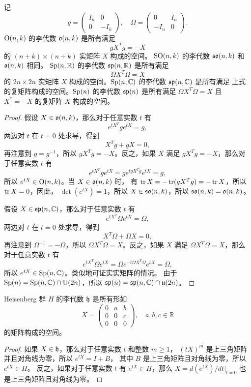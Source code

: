 \begin{proposition}
  记
  \[
    g=\begin{pmatrix}
      I_n & 0 \\
      0 & -I_k
    \end{pmatrix},\quad
    \Omega=\begin{pmatrix}
      0 & I_n \\
      -I_n & 0
    \end{pmatrix}.
  \]
  $\operatorname{O}(n,k)$ 的李代数 $\mathfrak{o}(n,k)$ 是所有满足
  \[
    gX^Tg=-X
  \]
  的 $(n+k)\times (n+k)$ 实矩阵 $X$ 构成的空间。
  $\operatorname{SO}(n,k)$ 的李代数 $\mathfrak{so}(n,k)$ 和 $\mathfrak{o}(n,k)$ 相同。
  $\operatorname{Sp}(n,\mathbb{R})$ 的李代数 $\mathfrak{sp}(n,\mathbb{R})$ 是所有满足
  \[
    \Omega X^T\Omega=X
  \]
  的 $2n\times 2n$ 实矩阵 $X$ 构成的空间。$\operatorname{Sp}(n,\mathbb{C})$ 的李代数 $\mathfrak{sp}(n,\mathbb{C})$ 是所有满足
  上式的复矩阵构成的空间。$\operatorname{Sp}(n)$ 的李代数 $\mathfrak{sp}(n)$ 是所有满足
  $\Omega X^T\Omega=X$ 且 $X^*=-X$ 的复矩阵 $X$ 构成的空间。
\end{proposition}
\begin{proof}
  假设 $X\in \mathfrak{o}(n,k)$，那么对于任意实数 $t$ 有
  \[
    e^{tX^T}ge^{tX}=g,
  \]
  两边对 $t$ 在 $t=0$ 处求导，得到
  \[
    X^Tg+gX=0,
  \]
  再注意到 $g=g^{-1}$，所以 $gX^Tg=-X$。反之，如果 $X$ 满足
  $gX^Tg=-X$，那么对于任意实数 $t$ 有
  \[  
    e^{tX^T}g e^{tX}=ge^{tgX^Tg}e^{tX}=g,
  \]
  所以 $e^{tX}\in\operatorname{O}(n,k)$。当 $X\in \mathfrak{o}(n,k)$ 时，
  有 $\operatorname{tr} X=-\operatorname{tr}(gX^Tg)=-\operatorname{tr} X$，所以 $\operatorname{tr} X=0$，因此，
  $\det(e^{tX})=1$，所以 $X\in \mathfrak{so}(n,k)$，所以 $\mathfrak{so}(n,k)=\mathfrak{o}(n,k)$。

  假设 $X\in\mathfrak{sp}(n,\mathbb{C})$，那么对于任意实数 $t$ 有
  \[
    e^{tX^T}\Omega e^{tX}=\Omega,
  \]
  两边对 $t$ 在 $t=0$ 处求导，得到
  \[
    X^T\Omega+\Omega X=0,
  \]
  再注意到 $\Omega^{-1}=-\Omega$，所以 $\Omega X^T\Omega=X$。反之，如果 $X$ 满足
  $\Omega X^T\Omega=X$，那么对于任意实数 $t$ 有
  \[  
    e^{tX^T}\Omega e^{tX}=\Omega e^{-t\Omega X^T\Omega}e^{tX}=\Omega,
  \]
  所以 $e^{tX}\in\operatorname{Sp}(n,\mathbb{C})$。类似地可证实实矩阵的情况。
  由于 $\operatorname{Sp}(n)=\operatorname{Sp}(n,\mathbb{C})\cap \operatorname{U}(2n)$，所以 $\mathfrak{sp}(n)=\mathfrak{sp}(n,\mathbb{C})\cap \mathfrak{u}(2n)$。
\end{proof}

\begin{proposition}
  Heisenberg 群 $H$ 的李代数 $\mathfrak{h}$ 是所有形如
  \[
    X=\begin{pmatrix}
      0 & a & b \\
      0 & 0 & c \\
      0 & 0 & 0
    \end{pmatrix},\quad a,b,c\in \mathbb{R}
  \]
  的矩阵构成的空间。
\end{proposition}
\begin{proof}
  如果 $X\in \mathfrak{h}$，那么对于任意实数 $t$ 和整数 $m\geq 1$，
  $(tX)^m$ 是上三角矩阵并且对角线为零，所以 $e^{tX}=I+B$，
  其中 $B$ 是上三角矩阵且对角线为零，所以 $e^{tX}\in H$。
  反之，如果对于任意实数 $t$ 有 $e^{tX}\in H$，那么 
  $X=d(e^{tX})/dt\big|_{t=0}$  也是上三角矩阵且对角线为零。
\end{proof}




